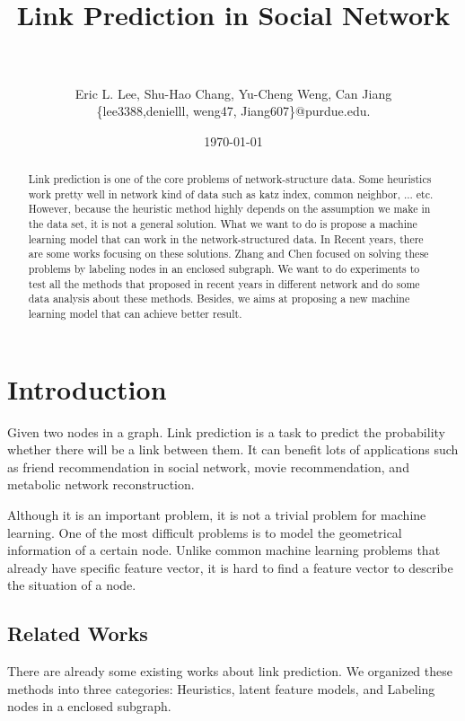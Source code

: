 \documentclass[paper=letter, fontsize=12pt]{scrartcl} %
\title{	
\normalfont \normalsize 
\horrule{2pt} \\[0.4cm] %
{\LARGE Link Prediction in Social Network} \\ %
\horrule{1pt} \\[0.5cm] %
}
\author{\large{Eric L. Lee, Shu-Hao Chang, Yu-Cheng Weng, Can Jiang}\\
  \normalsize{\{lee3388,denielll, weng47, Jiang607\}@purdue.edu.}
} %
\date{} %
\date{\today}
\begin{document}
\maketitle %

\begin{abstract}
  Link prediction is one of the core problems of network-structure data. Some heuristics work pretty well in network kind of data such as katz index\cite{katz}, common neighbor, ... etc. However, because the heuristic method highly depends on the assumption we make in the data set, it is not a general solution. What we want to do is propose a machine learning model that can work in the network-structured data. In Recent years, there are some works focusing on these solutions. Zhang and Chen \cite{lpnn} \cite{wlnn} focused on solving these problems by labeling nodes in an enclosed subgraph. We want to do experiments to test all the methods that proposed in recent years in different network and do some data analysis about these methods. Besides, we aims at proposing a new machine learning model that can achieve better result.
\end{abstract}

\section{Introduction}
Given two nodes in a graph. Link prediction is a task to predict the probability whether there will be a link between them. It can benefit lots of applications such as friend recommendation in social network, movie recommendation, and metabolic network reconstruction.

Although it is an important problem, it is not a trivial problem for machine learning. One of the most difficult problems is to model the geometrical information of a certain node. Unlike common machine learning problems that already have specific feature vector, it is hard to find a feature vector to describe the situation of a node.

\subsection {Related Works}
There are already some existing works about link prediction. We organized these methods into three categories: Heuristics, latent feature models, and  Labeling nodes in a enclosed subgraph.
\end{document}
